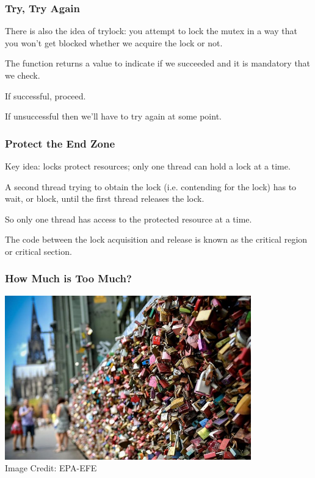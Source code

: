 \begin{frame}
\frametitle{Try, Try Again}

There is also the idea of trylock: you attempt to lock the mutex in a way that you won't get blocked whether we acquire the lock or not. 

The function returns a value to indicate if we succeeded and it is mandatory that we check. 

If successful, proceed. 

If unsuccessful then we'll have to try again at some point.
\end{frame}

\begin{frame}
\frametitle{Protect the End Zone}

Key idea: locks protect resources; only one thread
can hold a lock at a time. 

A second thread trying to obtain the lock
(i.e. \alert{contending} for the lock) has to wait, or \alert{block},
until the first thread releases the lock. 

So only one thread has
access to the protected resource at a time. 

The code between the lock
acquisition and release is known as the \alert{critical region} or \alert{critical section}.

\end{frame}


\begin{frame}
\frametitle{How Much is Too Much?}

\begin{center}
	\includegraphics[width=0.8\textwidth]{images/locktoomuch.jpg}\\
	\hfill Image Credit: EPA-EFE
\end{center}

\end{frame}


